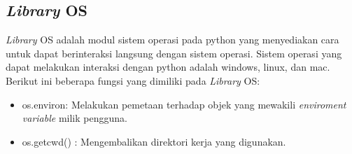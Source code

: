 \subsection{\textit{Library} OS}
\textit{Library} OS adalah modul sistem operasi pada python yang menyediakan cara untuk dapat berinteraksi langsung dengan sistem operasi. Sistem operasi yang dapat melakukan interaksi dengan python adalah windows, linux, dan mac. Berikut ini beberapa fungsi yang dimiliki pada \textit{Library} OS:
\begin{itemize}
	\item os.environ: Melakukan pemetaan terhadap objek yang mewakili \textit{enviroment variable} milik pengguna.
	\item os.getcwd() : Mengembalikan direktori kerja yang digunakan. 
\end{itemize}
